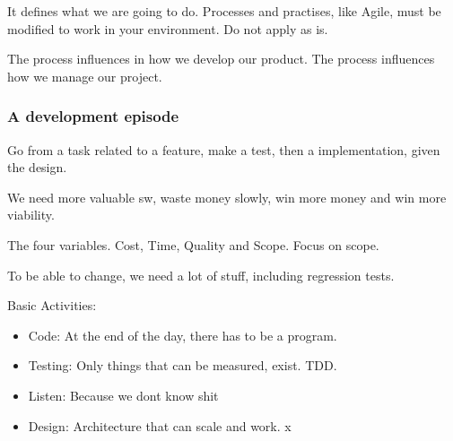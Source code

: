 \documentclass[a4paper,12pt]{article}
\begin{document}
It defines what we are going to do. Processes and practises, like Agile, must be modified to work in your environment. Do not apply as is.

The process influences in how we develop our product. The process influences how we manage our project. 

\subsubsection{A development episode}

Go from a task related to a feature, make a test, then a implementation, given the design.

We need more valuable sw, waste money slowly, win more money and win more viability.

The four variables. Cost, Time, Quality and Scope. Focus on scope.

To be able to change, we need a lot of stuff, including regression tests.

Basic Activities:

\begin{itemize}
\item Code: At the end of the day, there has to be a program.
\item Testing: Only things that can be measured, exist. TDD. 
\item Listen: Because we dont know shit
  \item Design: Architecture that can scale and work. x
\end{itemize}
\end{document}
